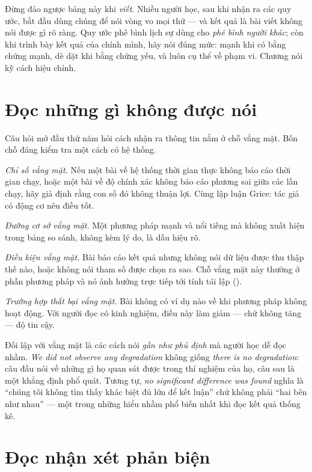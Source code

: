 \documentclass[../../english.tex]{subfiles}
\begin{document}
\begin{cambay}
Đừng đảo ngược bảng này khi \emph{viết}. Nhiều người học, sau khi nhận ra các quy ước, bắt đầu dùng chúng để nói vòng vo mọi thứ --- và kết quả là bài viết không nói được gì rõ ràng. Quy ước phê bình lịch sự dùng cho \emph{phê bình người khác}; còn khi trình bày kết quả của chính mình, hãy nói đúng mức: mạnh khi có bằng chứng mạnh, dè dặt khi bằng chứng yếu, và luôn cụ thể về phạm vi. Chương  nói kỹ cách hiệu chỉnh.
\end{cambay}

\section{Đọc những gì không được nói}

Câu hỏi mở đầu thứ năm hỏi cách nhận ra thông tin nằm ở chỗ vắng mặt. Bốn chỗ đáng kiểm tra một cách có hệ thống.

\emph{Chỉ số vắng mặt.} Nếu một bài về hệ thống thời gian thực không báo cáo thời gian chạy, hoặc một bài về độ chính xác không báo cáo phương sai giữa các lần chạy, hãy giả định rằng con số đó không thuận lợi. Cùng lập luận Grice: tác giả có động cơ nêu điều tốt.

\emph{Đường cơ sở vắng mặt.} Một phương pháp mạnh và nổi tiếng mà không xuất hiện trong bảng so sánh, không kèm lý do, là dấu hiệu rõ.

\emph{Điều kiện vắng mặt.} Bài báo cáo kết quả nhưng không nói dữ liệu được thu thập thế nào, hoặc không nói tham số được chọn ra sao. Chỗ vắng mặt này thường ở phần phương pháp và nó ảnh hưởng trực tiếp tới tính tái lập ().

\emph{Trường hợp thất bại vắng mặt.} Bài không có ví dụ nào về khi phương pháp không hoạt động. Với người đọc có kinh nghiệm, điều này làm giảm --- chứ không tăng --- độ tin cậy.

Đối lập với vắng mặt là các cách nói \emph{gần như phủ định} mà người học dễ đọc nhầm. \emph{We did not observe any degradation} không giống \emph{there is no degradation}: câu đầu nói về những gì họ quan sát được trong thí nghiệm của họ, câu sau là một khẳng định phổ quát. Tương tự, \emph{no significant difference was found} nghĩa là ``chúng tôi không tìm thấy khác biệt đủ lớn để kết luận'' chứ không phải ``hai bên như nhau'' --- một trong những hiểu nhầm phổ biến nhất khi đọc kết quả thống kê.

\section{Đọc nhận xét phản biện}
\end{document}
